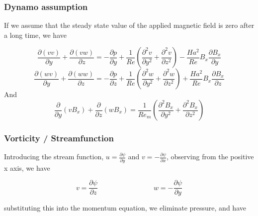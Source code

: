 \documentclass[11pt]{article}
\begin{document}
\subsubsection{Dynamo assumption}
If we assume that the steady state value of the applied magnetic field is zero after a long time, we have

\begin{equation}
	\frac{\partial (v v)}{\partial y}
	+ \frac{\partial (v w)}{\partial z}
	= 
	- \frac{\partial p}{\partial y}
	+ \frac{1}{Re}
	\left(
	\frac{\partial^2 v}{\partial y^2}
	+\frac{\partial^2 v}{\partial z^2}
	\right)
	- 
	\frac{Ha^2}{Re}
	B_x
	\frac{\partial B_x}{\partial y} 
\end{equation}
\begin{equation}
	\frac{\partial (w v)}{\partial y}
	+ \frac{\partial (w w)}{\partial z}
	= 
	- \frac{\partial p}{\partial z}
	+ \frac{1}{Re}
	\left(
	\frac{\partial^2 w}{\partial y^2}
	+\frac{\partial^2 w}{\partial z^2}
	\right)
	+ \frac{Ha^2}{Re}
	B_x
	\frac{\partial B_x}{\partial z} 
\end{equation}
And
\begin{equation}
	\frac{\partial}{\partial y} (v B_x)
	+ \frac{\partial}{\partial z} (w B_x)
	=
	\frac{1}{Re_m}
	\left(
	\frac{\partial^2 B_x}{\partial y^2}
	+
	\frac{\partial^2 B_x}{\partial z^2}
	\right)
\end{equation}

\subsubsection{Vorticity / Streamfunction}

Introducing the stream function, $u = \frac{\partial \psi}{\partial y}$ and $v = - \frac{\partial \psi}{\partial x}$, observing from the positive x axis, we have

\begin{equation}
	v = \frac{\partial \psi}{\partial z}
	\qquad \qquad \qquad \qquad
	w = - \frac{\partial \psi}{\partial y}
\end{equation}

substituting this into the momentum equation, we eliminate pressure, and have
\end{document}
